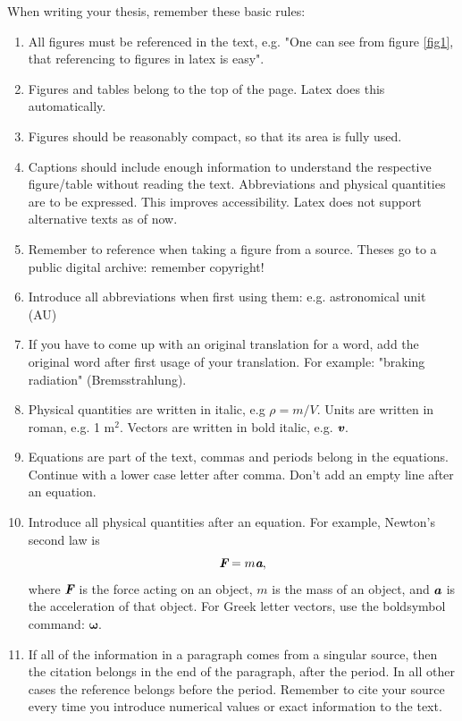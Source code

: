 When writing your thesis, remember these basic rules:
\begin{enumerate}
\item All figures must be referenced in the text, e.g. "One can see from figure \ref{fig1}, that referencing to figures in latex is easy".
\item Figures and tables belong to the top of the page. Latex does this automatically.

\item Figures should be reasonably compact, so that its area is fully used.

\item Captions should include enough information to understand the respective figure/table without reading the text. Abbreviations and physical quantities are to be expressed. This improves accessibility. Latex does not support alternative texts as of now.

\item  Remember to reference when taking a figure from a source. Theses go to a public digital archive: remember copyright!

\item Introduce all abbreviations when first using them: e.g. astronomical unit (AU)

\item If you have to come up with an original translation for a word, add the original word after first usage of your translation. For example: "braking radiation" (Bremsstrahlung).

\item Physical quantities are written in italic, e.g $\rho = m/V$. Units are written in roman, e.g. 1 m$^2$. Vectors are written in bold italic, e.g. $\textbf{\em v}$.

\item Equations are part of the text, commas and periods belong in the equations. Continue with a lower case letter after comma. Don't add an empty line after an equation.

\item Introduce all physical quantities after an equation. For example, Newton's second law is
\begin{equation}
\textbf{\em F} = m\textbf{\em a},
\end{equation}
where $\textbf{\em F}$ is the force acting on an object, $m$ is the mass of an object, and $\textbf{\em a}$ is the acceleration of that object. For Greek letter vectors, use the boldsymbol command: $\boldsymbol{\omega}$.

\item If all of the information in a paragraph comes from a singular source, then the citation belongs in the end of the paragraph, after the period. In all other cases the reference belongs before the period. Remember to cite your source every time you introduce numerical values or exact information to the text.

\end{enumerate}


